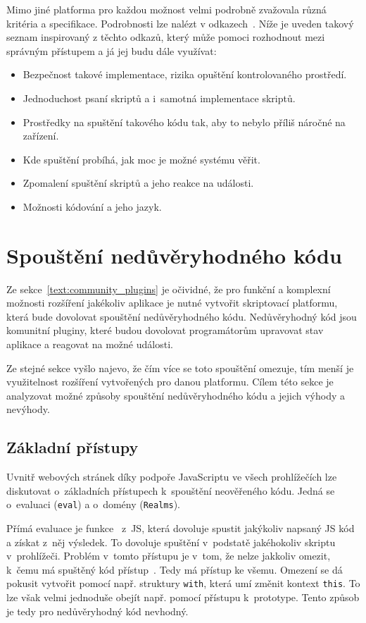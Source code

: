 Mimo jiné platforma pro každou možnost velmi podrobně zvažovala různá kritéria a specifikace.
Podrobnosti lze nalézt v odkazech~\cite{figma_plugins_blog, figma_website}.
Níže je uveden takový seznam inspirovaný z těchto odkazů, který může pomoci rozhodnout mezi správným přístupem a já jej budu dále využívat:

\begin{itemize}
    \item Bezpečnost takové implementace, rizika opuštění kontrolovaného prostředí.
    \item Jednoduchost psaní skriptů a i~samotná implementace skriptů.
    \item Prostředky na spuštění takového kódu tak, aby to nebylo příliš náročné na zařízení.
    \item Kde spuštění probíhá, jak moc je možné systému věřit.
    \item Zpomalení spuštění skriptů a jeho reakce na události.
    \item Možnosti kódování a jeho jazyk.
\end{itemize}

\section{Spouštění nedůvěryhodného kódu}\label{text:anaylza/spousteniNeduveryhodnehoKodu}

Ze sekce~\ref{text:community_plugins} je očividné, že pro funkční a komplexní možnosti rozšíření jakékoliv aplikace je nutné vytvořit skriptovací platformu, která bude dovolovat spouštění nedůvěryhodného kódu.
Nedůvěryhodný kód jsou komunitní pluginy, které budou dovolovat programátorům upravovat stav aplikace a reagovat na možné události.

Ze stejné sekce vyšlo najevo, že čím více se toto spouštění omezuje, tím menší je využitelnost rozšíření vytvořených pro danou platformu.
Cílem této sekce je analyzovat možné způsoby spouštění nedůvěryhodného kódu a jejich výhody a nevýhody.

\subsection{Základní přístupy}

Uvnitř webových stránek díky podpoře JavaScriptu ve všech prohlížečích lze diskutovat o~základních přístupech k~spouštění neověřeného kódu.
Jedná se o~evaluaci (\texttt{eval}) a o~domény (\texttt{Realms}).

Přímá evaluace je funkce~\cite{eval} z~JS, která dovoluje spustit jakýkoliv napsaný JS kód a získat z~něj výsledek.
To dovoluje spuštění v~podstatě jakéhokoliv skriptu v~prohlížeči.
Problém v~tomto přístupu je v~tom, že nelze jakkoliv omezit, k~čemu má spuštěný kód přístup~\cite{eval, shadowrealms, figma_plugins_blog}.
Tedy má přístup ke všemu.
Omezení se dá pokusit vytvořit pomocí např. struktury \texttt{with}, která umí změnit kontext \texttt{this}.
To lze však velmi jednoduše obejít např. pomocí přístupu k~prototype.
Tento způsob je tedy pro nedůvěryhodný kód nevhodný.

